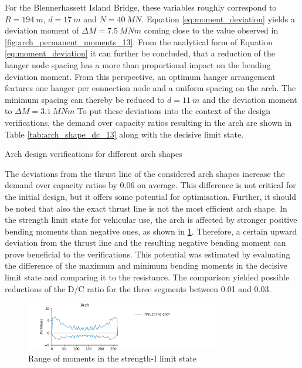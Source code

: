 For the Blennerhassett Island Bridge, these variables roughly correspond to $R=\SI{194}{m}$, $d=\SI{17}{m}$ and $N=\SI{40}{MN}$. Equation \eqref{eq:moment_deviation} yields a deviation moment of $\Delta M=\SI{7.5}{MNm}$ coming close to the value observed in \cref{fig:arch_permanent_moments_13}. From the analytical form of Equation \eqref{eq:moment_deviation} it can further be concluded, that a reduction of the hanger node spacing has a more than proportional impact on the bending deviation moment. From this perspective, an optimum hanger arrangement features one hanger per connection node and a uniform spacing on the arch. The minimum spacing can thereby be reduced to $d=\SI{11}{m}$ and the deviation moment to $\Delta M=\SI{3.1}{MNm}$
To put these deviations into the context of the design verifications, the demand over capacity ratios resulting in the arch are shown in Table \ref{tab:arch_shape_dc_13} along with the decisive limit state.

\begin{table}[H]
    \centering
    \caption{Arch design verifications for different arch shapes}
    \label{tab:arch_shape_dc_13}
    
\end{table}

The deviations from the thrust line of the considered arch shapes increase the demand over capacity ratios by 0.06 on average. This difference is not critical for the initial design, but it offers some potential for optimisation. Further, it should be noted that also the exact thrust line is not the most efficient arch shape. In the strength limit state for vehicular use, the arch is affected by stronger positive bending moments than negative ones, as shown in \cref{fig:arch_shape_strength_1}. Therefore, a certain upward deviation from the thrust line and the resulting negative bending moment can prove beneficial to the verifications. This potential was estimated by evaluating the difference of the maximum and minimum bending moments in the decisive limit state and comparing it to the resistance. The comparison yielded possible reductions of the D/C ratio for the three segments between 0.01 and 0.03.

\begin{figure}[H]
    \centering
    \includegraphics[trim={1cm 0 3cm 0},clip, width=0.76\textwidth]{calculations/arch shape/strength-I_13.png}
    \caption{Range of moments in the strength-I limit state}
    \label{fig:arch_shape_strength_1}
\end{figure}


